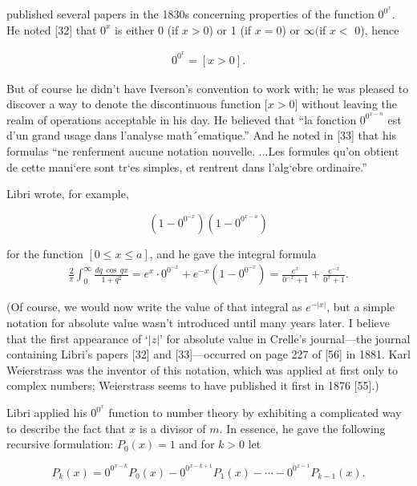 \documentclass[10pt]{article}
\begin{document}
\section*{}
published several papers in the 1830s concerning properties of the function $0^{0^{x}}$. He noted [32] that $0^{x}$ is either 0 (if $x > 0$) or 1 (if $x = 0$) or $\infty ($if $x < $ 0), hence

\begin{align}
0^{0^{x}} = [x > 0]. \tag{1.17}
\end{align}



But of course he didn’t have Iverson’s convention to work with; he was pleased to discover a way
to denote the discontinuous function [$x > 0$] without leaving the realm of operations acceptable in
his day. He believed that “la fonction $0^{0^{x-n}}$
est d’un grand usage dans l’analyse math´ematique.”
And he noted in [33] that his formulas “ne renferment aucune notation nouvelle. ...Les formules
qu’on obtient de cette mani`ere sont tr`es simples, et rentrent dans l’alg`ebre ordinaire.”
      
      Libri wrote, for example,
      
$$
(1 - 0^{0^{-x}})(1 - 0^{0^{x-a}})
$$

for the function $[0 \leq x \leq a]$, and he gave the integral formula 
\begin{align}
	\frac{2}{\pi} \int_{0}^{\infty} \frac{dq\,\cos\,qx}{1+q^{2}} = e^x \cdot 0^{0^{-x}} + e^{-x}(1-0^{0^{-x}}) = \frac{e^{x}}{0^{-x}+1}+\frac{e^{-x}}{0^{x}+1}.\nonumber
\end{align} 

(Of course, we would now write the value of that integral as $e^{-|x|}$, but a simple notation for
absolute value wasn’t introduced until many years later. I believe that the first appearance of `\textquotesingle $|z|$'
for absolute value in Crelle’s journal—the journal containing Libri’s papers [32] and [33]—occurred
on page 227 of [56] in 1881. Karl Weierstrass was the inventor of this notation, which was applied
at first only to complex numbers; Weierstrass seems to have published it first in 1876 [55].)

Libri applied his $0^{0^{x}}$ function to number theory by exhibiting a
complicated way to describe the fact
that $x$ is a divisor of $m$. In essence,
he gave the following recursive formulation: 
$P_0(x) = 1$ and for $k > 0$ let

$$ P_k (x) = 0^{0^{x-k}} P_0(x) - 0^{0^{x-k+1}} P_1(x) - \cdots - 0^{0^{x-1}} P_{k-1} (x).$$
\end{document}
